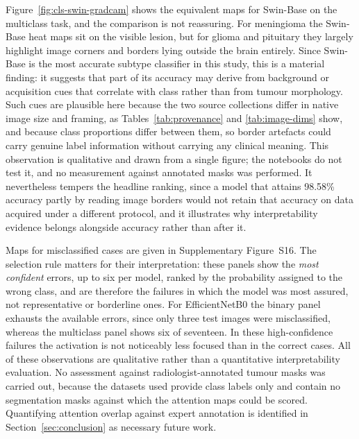 \documentclass[final,3p,times,number]{elsarticle}
\begin{document}
Figure~\ref{fig:cls-swin-gradcam} shows the equivalent maps for Swin-Base on the multiclass task, and the comparison is not reassuring. For meningioma the Swin-Base heat maps sit on the visible lesion, but for glioma and pituitary they largely highlight image corners and borders lying outside the brain entirely. Since Swin-Base is the most accurate subtype classifier in this study, this is a material finding: it suggests that part of its accuracy may derive from background or acquisition cues that correlate with class rather than from tumour morphology. Such cues are plausible here because the two source collections differ in native image size and framing, as Tables~\ref{tab:provenance} and \ref{tab:image-dims} show, and because class proportions differ between them, so border artefacts could carry genuine label information without carrying any clinical meaning. This observation is qualitative and drawn from a single figure; the notebooks do not test it, and no measurement against annotated masks was performed. It nevertheless tempers the headline ranking, since a model that attains 98.58\% accuracy partly by reading image borders would not retain that accuracy on data acquired under a different protocol, and it illustrates why interpretability evidence belongs alongside accuracy rather than after it.

Maps for misclassified cases are given in Supplementary Figure~S16. The selection rule matters for their interpretation: these panels show the \emph{most confident} errors, up to six per model, ranked by the probability assigned to the wrong class, and are therefore the failures in which the model was most assured, not representative or borderline ones. For EfficientNetB0 the binary panel exhausts the available errors, since only three test images were misclassified, whereas the multiclass panel shows six of seventeen. In these high-confidence failures the activation is not noticeably less focused than in the correct cases. All of these observations are qualitative rather than a quantitative interpretability evaluation. No assessment against radiologist-annotated tumour masks was carried out, because the datasets used provide class labels only and contain no segmentation masks against which the attention maps could be scored. Quantifying attention overlap against expert annotation is identified in Section~\ref{sec:conclusion} as necessary future work.
\end{document}
